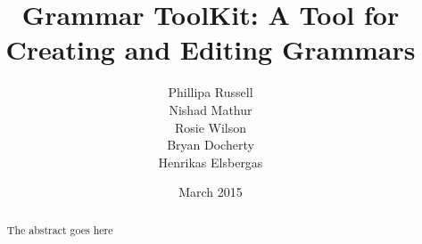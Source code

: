 \documentclass{l3proj}
\begin{document}
\title{Grammar ToolKit: A Tool for Creating and Editing Grammars}
\author{Phillipa Russell \\
        Nishad Mathur \\
        Rosie Wilson \\
        Bryan Docherty \\
        Henrikas Elsbergas}
        
\date{ March 2015}
\maketitle
\begin{abstract}

The abstract goes here

\end{abstract}
\educationalconsent
\tableofcontents










\end{document}
